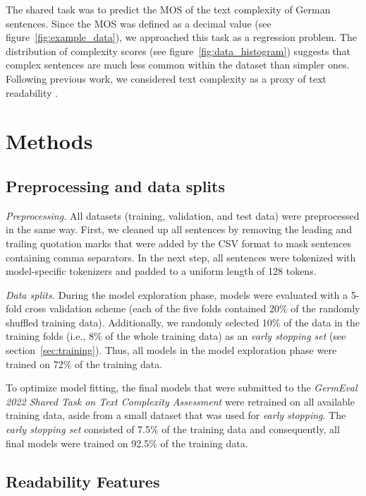 \documentclass[11pt,a4paper]{article}
\begin{document}
The shared task was to predict the MOS of the text complexity of German sentences.
Since the MOS was defined as a decimal value (see figure~\ref{fig:example_data}), we approached this task as a regression problem.
The distribution of complexity scores (see figure~\ref{fig:data_histogram}) suggests that complex sentences are much less common within the dataset than simpler ones.
Following previous work, we considered text complexity as a proxy of text readability \cite{Wray2013}. 

\section{Methods}
\label{sec:methods}

\subsection{Preprocessing and data splits}
\label{ssec:preprocessing}

\emph{Preprocessing.}
All datasets (training, validation, and test data) were preprocessed in the same way.
First, we cleaned up all sentences by removing the leading and trailing quotation marks that were added by the CSV format to mask sentences containing comma separators.
In the next step, all sentences were tokenized with model-specific tokenizers and padded to a uniform length of 128 tokens.

\emph{Data splits.}
During the model exploration phase, models were evaluated with a 5-fold cross validation scheme (each of the five folds contained 20\% of the randomly shuffled training data).
Additionally, we randomly selected 10\% of the data in the training folds (i.e., 8\% of the whole training data) as an \emph{early stopping set} (see section~\ref{sec:training}).
Thus, all models in the model exploration phase were trained on 72\% of the training data.

To optimize model fitting, the final models that were submitted to the \emph{GermEval 2022 Shared Task on Text Complexity Assessment} were retrained on all available training data, aside from a small dataset that was used for \emph{early stopping}.
The \emph{early stopping set} consisted of 7.5\% of the training data and consequently, all final models were trained on 92.5\% of the training data. 
\subsection{Readability Features}
\label{ssec:features}
\end{document}
